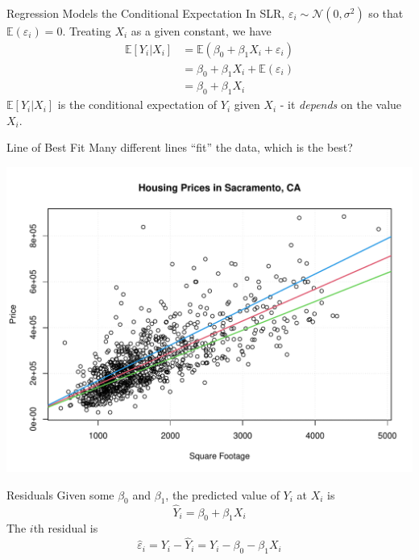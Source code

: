 \documentclass{beamer}
\begin{document}
\begin{frame}{Regression Models the Conditional Expectation}
    In SLR, $\varepsilon_i \sim \mathcal{N}(0, \sigma^2)$ so that $\mathbb{E}(\varepsilon_i) = 0$. Treating $X_i$ as a given constant, we have  
    \begin{equation*}
        \begin{split}
            \mathbb{E}[Y_i | X_i] &= \mathbb{E}(\beta_0 + \beta_1 X_i + \varepsilon_i) \\
            &= \beta_0 + \beta_1 X_i + \mathbb{E}(\varepsilon_i) \\
            &= \beta_0 + \beta_1 X_i
        \end{split}
    \end{equation*}
    $\mathbb{E}[Y_i | X_i]$ is the conditional expectation of $Y_i$ given $X_i$ - it \textit{depends} on the value $X_i$. 
\end{frame}

\begin{frame}{Line of Best Fit}
    Many different lines ``fit'' the data, which is the best?
    \begin{center}
        \includegraphics[width=.9\linewidth]{figures/sacramento_lines.pdf}
    \end{center}
\end{frame}

\begin{frame}{Residuals}
    Given some $\beta_0$ and $\beta_1$, the predicted value of $Y_i$ at $X_i$ is 
    \begin{equation*}
        \hat{Y}_i = \beta_0 + \beta_1 X_i
    \end{equation*}
    The $i$th residual is 
    \begin{equation*}
        \hat{\varepsilon}_i = Y_i - \hat{Y}_i = Y_i - \beta_0 - \beta_1 X_i
    \end{equation*}
\end{frame}
\end{document}
